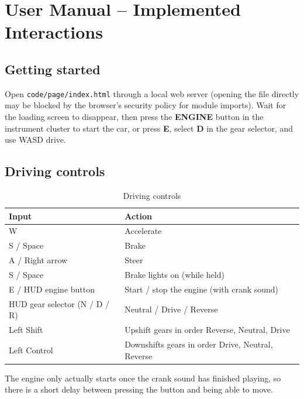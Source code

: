 \documentclass[11pt]{article}
\begin{document}
\section{User Manual -- Implemented Interactions}

\subsection{Getting started}
Open \texttt{code/page/index.html} through a local web server (opening the
file directly may be blocked by the browser's security policy for module
imports). Wait for the loading screen to disappear, then press the
\textbf{ENGINE} button in the instrument cluster to start the car, or press \textbf{E}, select
\textbf{D} in the gear selector, and use WASD drive.

\subsection{Driving controls}
\begin{table}[h]
\centering
\caption{Driving controls}
\begin{tabular}{ll}
\toprule
Input & Action \\
\midrule
W & Accelerate \\
S / Space & Brake \\
A / Right arrow & Steer \\
S / Space & Brake lights on (while held) \\
E / HUD engine button & Start / stop the engine (with crank sound) \\
HUD gear selector (N / D / R) & Neutral / Drive / Reverse \\
Left Shift & Upshift gears in order Reverse, Neutral, Drive \\
Left Control & Downshifts gears in order Drive, Neutral, Reverse \\
\bottomrule
\end{tabular}
\end{table}
The engine only actually starts once the crank sound has finished playing,
so there is a short delay between pressing the button and being able to
move.
\end{document}
